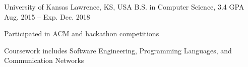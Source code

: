 \documentclass[11pt]{resume}
\begin{document}
\makecvheader[C]




\begin{cventries}



\cventry
  {University of Kansas}
  {Lawrence, KS, USA}
  {B.S. in Computer Science, 3.4 GPA}
  {Aug. 2015 – Exp. Dec. 2018}
  {
    \begin{cvitems}
    \item { Participated in ACM and hackathon competitions }
    \item { Coursework includes Software Engineering, Programming Languages,
        and Communication Networks }
    \end{cvitems}
  }




\end{cventries}


\end{document}
